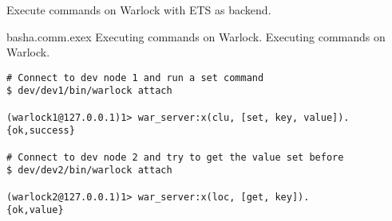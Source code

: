 Execute commands on Warlock with ETS as backend.

\begin{scode}{bash}{a.comm.exex}{%
  Executing commands on Warlock.}{%
  Executing commands on Warlock.}
  \begin{lstlisting}
# Connect to dev node 1 and run a set command  
$ dev/dev1/bin/warlock attach

(warlock1@127.0.0.1)1> war_server:x(clu, [set, key, value]).
{ok,success}

# Connect to dev node 2 and try to get the value set before
$ dev/dev2/bin/warlock attach

(warlock2@127.0.0.1)1> war_server:x(loc, [get, key]).
{ok,value}
  \end{lstlisting}
\end{scode}
